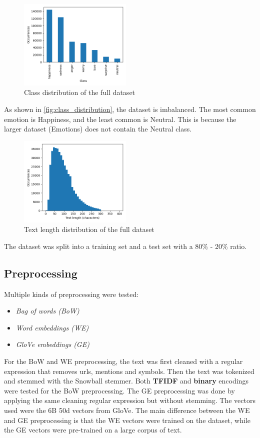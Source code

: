 \begin{figure}[H]
    \capstart
    \centering
    \includegraphics[width=0.48\textwidth]{images/class_distribution.png}
    \caption{Class distribution of the full dataset}
    \label{fig:class_distribution}
\end{figure}

As shown in \autoref{fig:class_distribution},
the dataset is imbalanced. The most common
emotion is Happiness, and the least common
is Neutral. This is because the larger dataset
(Emotions) does not contain the Neutral class.

\begin{figure}[H]
    \capstart
    \centering
    \includegraphics[width=0.48\textwidth]{images/length_distribution.png}
    \caption{Text length distribution of the full dataset}
    \label{fig:length_distribution}
\end{figure}

The dataset was split into a training set
and a test set with a 80\% - 20\% ratio.

\subsection{Preprocessing}
Multiple kinds of preprocessing were tested:
\begin{itemize}
    \item \textit{Bag of words (BoW)}
    \item \textit{Word embeddings (WE)}
    \item \textit{GloVe embeddings (GE)}
\end{itemize}
For the BoW and WE preprocessing, the text was
first cleaned with a regular expression that
removes urls, mentions and symbols. Then the
text was tokenized and stemmed with the 
Snowball stemmer. Both \textbf{TFIDF} and 
\textbf{binary} encodings were tested for
the BoW preprocessing.
The GE preprocessing was done by applying 
the same cleaning regular
expression but without stemming. The vectors
used were the 6B 50d vectors from
GloVe\cite{glove}.
The main difference between the WE and GE
preprocessing is that the WE vectors were
trained on the dataset, while the GE vectors
were pre-trained on a large corpus of text.
